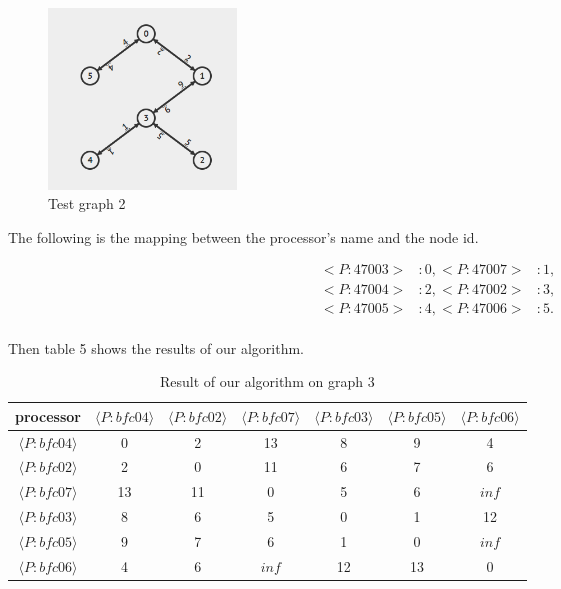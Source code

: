 \documentclass[11pt]{article}  %
\begin{document}
\begin{figure}[ht]
\centering
\includegraphics[width=5cm]{CP3_440Tree/CP3_440.png}
\caption{Test graph 2}
\end{figure}\par

The following is the mapping between the processor's name and the node id.\par

\begin{equation}\nonumber
\begin{aligned}
<P:47003>&: 0, 
<P:47007>&: 1, \\
<P:47004>&: 2, 
<P:47002>&: 3, \\
<P:47005>&: 4, 
<P:47006>&: 5. \\
\end{aligned}
\end{equation}\par
Then table 5 shows the results of our algorithm.\par 

\begin{table}[!htbp]
\centering
\setlength{\tabcolsep}{1mm}
\begin{tabular}{|c|c|c|c|c|c|c|}
\hline
processor&$\langle P:bfc04 \rangle$&$\langle P:bfc02\rangle$&$\langle P:bfc07\rangle$&$\langle P:bfc03\rangle$&$\langle P:bfc05\rangle$&$\langle P:bfc06\rangle$\\
\hline
$\langle P:bfc04\rangle$&0&2&13&8&9&4\\
\hline
$\langle P:bfc02\rangle$&2&0&11&6&7&6\\
\hline
$\langle P:bfc07\rangle$&13&11&0&5&6&$inf$\\
\hline
$\langle P:bfc03\rangle$&8&6&5&0&1&12\\
\hline
$\langle P:bfc05\rangle$&9&7&6&1&0&$inf$\\
\hline
$\langle P:bfc06\rangle$&4&6&$inf$&12&13&0\\
\hline
\end{tabular}
\caption{Result of our algorithm on graph 3}
\end{table}\par
\end{document}

